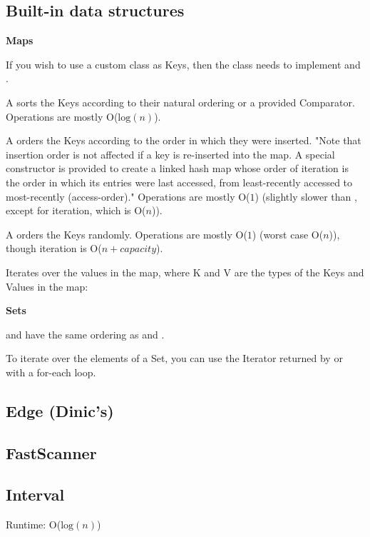 
\subsection*{Built-in data structures}

\textbf{Maps}

If you wish to use a custom class as Keys, then the class needs to implement  and .

A  sorts the Keys according to their natural ordering or a provided Comparator. Operations are mostly O($\text{log}(n)$).

A  orders the Keys according to the order in which they were inserted. "Note that insertion order is not affected if a key is re-inserted into the map. A special constructor is provided to create a linked hash map whose order of iteration is the order in which its entries were last accessed, from least-recently accessed to most-recently (access-order)." Operations are mostly O($1$) (slightly slower than , except for iteration, which is O($n$)).

A  orders the Keys randomly. Operations are mostly O($1$) (worst case O($n$)), though iteration is O($n+capacity$).

Iterates over the values in the map, where K and V are the types of the Keys and Values in the map:



\textbf{Sets}

 and  have the same ordering as  and .

To iterate over the elements of a Set, you can use the Iterator returned by  or with a for-each loop.

\subsection*{Edge (Dinic's)}



\subsection*{FastScanner}



\subsection*{Interval}

Runtime: O($\text{log}(n)$)



\newpage